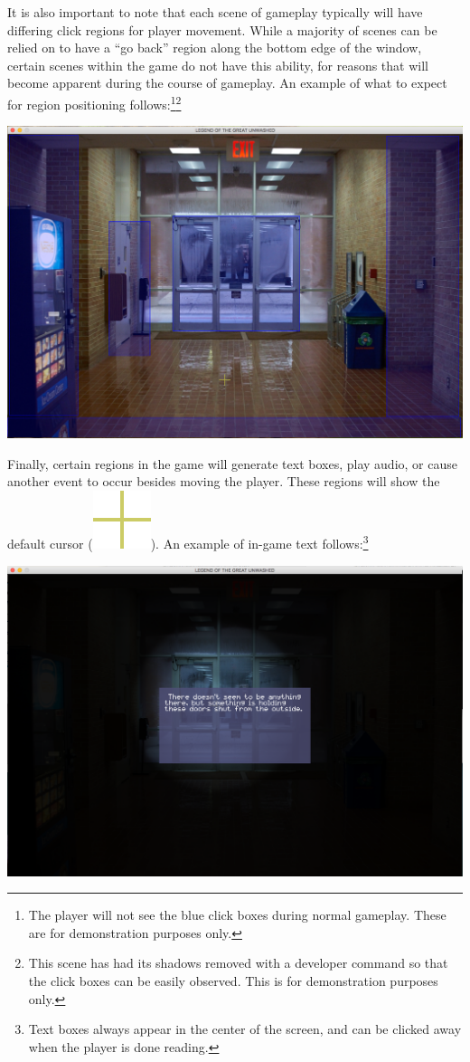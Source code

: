 \documentclass{article}
\begin{document}
		It is also important to note that each scene of gameplay typically will have differing click regions for player movement. While a majority of scenes can be relied on to have a ``go back'' region along the bottom edge of the window, certain scenes within the game do not have this ability, for reasons that will become apparent during the course of gameplay. An example of what to expect for region positioning follows:\footnote{The player will not see the blue click boxes during normal gameplay. These are for demonstration purposes only.}\footnote{This scene has had its shadows removed with a developer command so that the click boxes can be easily observed. This is for demonstration purposes only.}
		\begin{center}
			\includegraphics[scale=0.3]{UMimages/clickDemo}
		\end{center}
		Finally, certain regions in the game will generate text boxes, play audio, or cause another event to occur besides moving the player. These regions will show the default cursor (\includegraphics[scale=0.15]{UMimages/Default}). An example of in-game text follows:\footnote{Text boxes always appear in the center of the screen, and can be clicked away when the player is done reading.}
		\begin{center}
			\includegraphics[scale=0.3]{UMimages/textDemo}
		\end{center}
\end{document}
